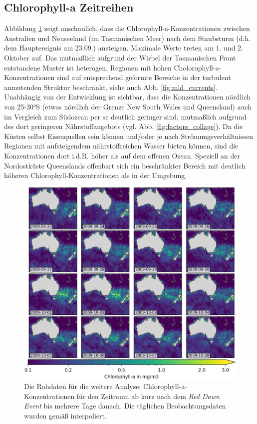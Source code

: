 \documentclass[12pt,a4paper,onecolumn,headheight=30pt]{scrartcl}
\begin{document}
\subsection{Chlorophyll-a Zeitreihen} \label{sec:chla_zeitreihen}
Abbildung \ref{fig:chla_collage} zeigt anschaulich, dass die Chlorophyll-a-Konzentrationen zwischen Australien und Neuseeland (im Tasmanischen Meer) nach dem Staubsturm (d.h. dem Hauptereignis am 23.09.) ansteigen. Maximale Werte treten am 1. und 2. Oktober auf. Das mutmaßlich aufgrund der Wirbel der Tasmanischen Front \citep{Gabric.2016} entstandene Muster ist heterogen, Regionen mit hohen Cholorophyll-a-Konzentrationen sind auf entsprechend geformte Bereiche in der turbulent anmutenden Struktur beschränkt, siehe auch Abb. \ref{fig:mld_currents}. Unabhängig von der Entwicklung ist sichtbar, dass die Konzentrationen nördlich von 25-30°S (etwas nördlich der Grenze New South Wales und Queensland) auch im Vergleich zum Südozean per se deutlich geringer sind, mutmaßlich aufgrund des dort geringeren Nährstoffangebots (vgl. Abb. \ref{fig:factors_collage}). Da die Küsten selbst Eisenquellen sein können und/oder je nach Strömungsverhältnissen Regionen mit aufsteigendem nährstoffreichen Wasser bieten können, sind die Konzentrationen dort i.d.R. höher als auf dem offenen Ozean. Speziell an der Nordostküste Queenslands offenbart sich ein beschränkter Bereich mit deutlich höheren Chlorophyll-Konzentrationen als in der Umgebung. 
\begin{figure}[htbp]
\includegraphics[width=\textwidth]{bilder/chl_collage.png}
\caption{Die Rohdaten für die weitere Analyse: Chlorophyll-a-Konzentrationen für den Zeitraum ab kurz nach dem \textit{Red Dawn Event} bis mehrere Tage danach. Die täglichen Beobachtungsdaten wurden gemäß \cite{Saulquin.2019} interpoliert.} \label{fig:chla_collage}
\end{figure}
\end{document}
